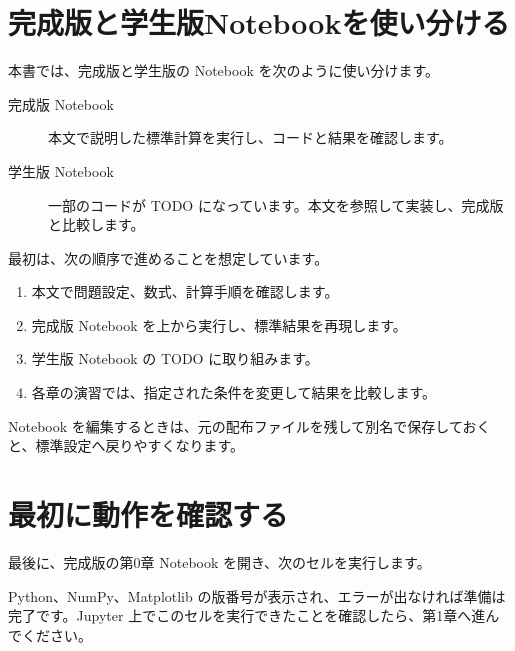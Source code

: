 \section{完成版と学生版Notebookを使い分ける}

本書では、完成版と学生版の Notebook を次のように使い分けます。

\begin{description}
  \item[完成版 Notebook] 本文で説明した標準計算を実行し、コードと結果を確認します。
  \item[学生版 Notebook] 一部のコードが TODO になっています。本文を参照して実装し、完成版と比較します。
\end{description}

最初は、次の順序で進めることを想定しています。

\begin{enumerate}
  \item 本文で問題設定、数式、計算手順を確認します。
  \item 完成版 Notebook を上から実行し、標準結果を再現します。
  \item 学生版 Notebook の TODO に取り組みます。
  \item 各章の演習では、指定された条件を変更して結果を比較します。
\end{enumerate}

Notebook を編集するときは、元の配布ファイルを残して別名で保存しておくと、標準設定へ戻りやすくなります。

\section{最初に動作を確認する}

最後に、完成版の第0章 Notebook を開き、次のセルを実行します。


Python、NumPy、Matplotlib の版番号が表示され、エラーが出なければ準備は完了です。Jupyter 上でこのセルを実行できたことを確認したら、第1章へ進んでください。
